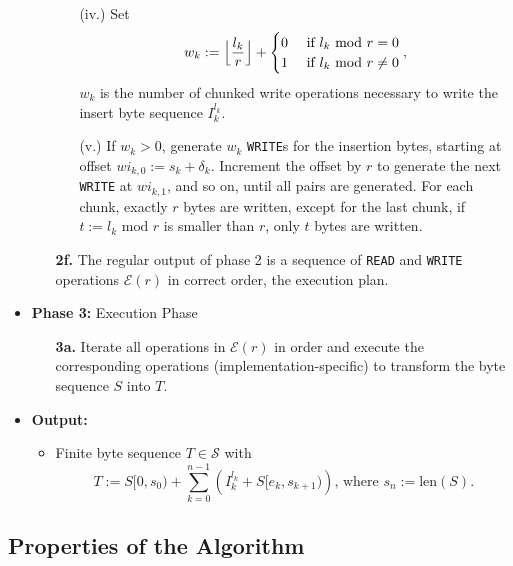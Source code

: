 \documentclass[english, 10pt, openright, twocolumn, landscape, twoside, notitlepage, a4paper, pdftex]		
{article}
\begin{document}
\begin{itemize}
\begin{enumerate}
\begin{enumerate}
\item [(iv.)] Set 
\[w_{k}:=\Bigl\lfloor\frac{l_{k}}{r}\Bigr\rfloor+
\begin{cases}
0 & \text{ if }l_{k}\text{ mod } r = 0\\
1 & \text{ if }l_{k}\text{ mod } r \neq 0\\
\end{cases},\]
$w_{k}$ is the number of chunked write operations necessary to write the insert byte sequence $I_{k}^{l_{k}}$.
\item [(v.)] If $w_{k}>0$, generate $w_{k}$ \texttt{WRITE}s for the insertion bytes, starting at offset $wi_{k,0}:=s_{k}+\delta_{k}$. Increment the offset by $r$ to generate the next \texttt{WRITE} at $wi_{k,1}$, and so on, until all pairs are generated. For each chunk, exactly $r$ bytes are written, except for the last chunk, if $t:=l_{k}\text{ mod } r$ is smaller than $r$, only $t$ bytes are written.
\end{enumerate}
\item [\textbf{2f.}] The regular output of phase 2 is a sequence of \texttt{READ} and \texttt{WRITE} operations $\mathcal{E}(r)$ in correct order, the execution plan.
\end{enumerate}
\item \textbf{Phase 3:} Execution Phase
\begin{enumerate}
\item [\textbf{3a.}] Iterate all operations in $\mathcal{E}(r)$ in order and execute the corresponding operations (implementation-specific) to transform the byte sequence $S$ into $T$.
\end{enumerate}
\item \textbf{Output:}
\begin{itemize}
\item Finite byte sequence $T\in\mathcal{S}$ with
\[T:=S[0,s_{0})+\sum_{k=0}^{n-1}{\left(I_{k}^{l_{k}}+S[e_{k},s_{k+1})\right)}\text{, where }s_{n}:=\text{len}(S).\]
\end{itemize}
\end{itemize}

\subsection{Properties of the Algorithm}%
\label{sec:PROPsAlgorithmSummary}%

\end{document}
